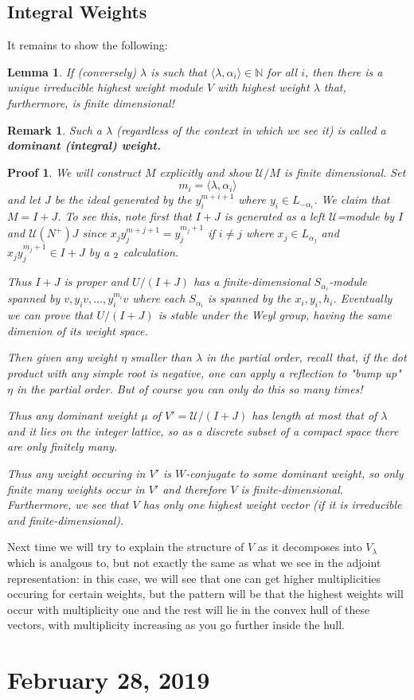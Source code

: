 \documentclass[12pt]{article}
\theoremstyle{nonumberbreak}
\theoremstyle{changebreak}
\newtheorem{lem}[thm]{Lemma}
\theoremstyle{nonumberbreak}
\newtheorem{prf}{Proof}
\theoremstyle{change}
\newtheorem{rmk}[thm]{Remark}
\newcommand*{\N}{
\mathbb{N}
}
\let\sl\relax
\DeclareMathOperator{\sl}{\mathfrak{sl}}
\begin{document}
\subsection{Integral Weights}
It remains to show the following:
\begin{lem}
	If (conversely) $\lambda$ is such that $\langle\lambda,\alpha_i\rangle\in\N$ for all $i$, 
	then there is a unique irreducible highest weight module $V$ with highest weight $\lambda$ 
	that, furthermore, is finite dimensional!
\end{lem}
\begin{rmk}
	Such a $\lambda$ (regardless of the context in which we see it) is called a \textbf{dominant (integral) weight.}
\end{rmk}
\begin{prf}
	We will construct $M$ explicitly and show $\mathcal U/M$ is finite dimensional. Set
	\[m_i=\langle\lambda,\alpha_i\rangle\]
	and let $J$ be the ideal generated by the $y_i^{m+i+1}$ where $y_i\in L_{-\alpha_i}$. We claim that $M=I+J$. To see this, note first that
	$I+J$ is generated as a left $\mathcal U$=module by $I$  and $\mathcal U(N^+)J$ since $x_jy_j^{m+j+1}=y_j^{m_j+1}$ if $i\ne j$ where $x_j\in L_{\alpha_j}$
	and $x_jy_j^{m_j+1}\in I+J$ by a $\sl_2$ calculation. 

	Thus $I+J$ is proper and $U/(I+J)$ has a finite-dimensional $S_{\alpha_i}$-module spanned by $v, y_iv,\dots, y_i^{m_i}v$
	where each $S_{\alpha_i}$ is spanned by the $x_i,y_i,h_i$. Eventually we can prove that $U/(I+J)$ is stable under 
	the Weyl group, having the same dimenion of its weight space.

	Then given any weight $\eta$ smaller than $\lambda$ in the partial order, recall that, if the dot product with any simple root 
	is negative, one can apply a reflection to "bump up" $\eta$ in the partial order. But of course you can only do this so many times!

	Thus any dominant weight $\mu$ of $V'=\mathcal U/(I+J)$ has length at most that of $\lambda$ and it lies on the integer lattice,
	so as a discrete subset of a compact space there are only finitely many.

	Thus any weight occuring in $V'$ is $W$-conjugate to some dominant weight, so only finite many weights occur in $V'$ 
	and therefore $V$ is finite-dimensional. Furthermore, we see that $V$ has only one highest weight vector (if it is irreducible and finite-dimensional). 
\end{prf}

Next time we will try to explain the structure of $V$ as it decomposes into $V_\lambda$ which is analgous to, but not
exactly the same as what we see in the adjoint representation: in this case, we will see that one can get higher multiplicities
occuring for certain weights, but the pattern will be that the highest weights will occur with multiplicity one and the rest 
will lie in the convex hull of these vectors, with multiplicity increasing as you go further inside the hull.

\section{February 28, 2019}
\end{document}
